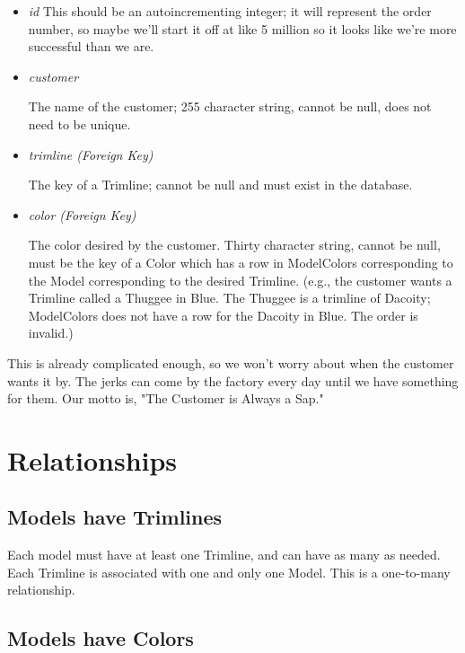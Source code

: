 \documentclass[11pt,letterpaper,oneside]{amsart}
\begin{document}
\begin{itemize}

\item \emph{id}
	This should be an autoincrementing integer; it will represent the order number, so maybe we'll start it off at like 5 million so it looks like we're more successful than we are.

\item \emph{customer}

	The name of the customer; 255 character string, cannot be null, does not need to be unique.
	
\item \emph{trimline (Foreign Key)}
	
	The key of a Trimline; cannot be null and must exist in the database.
	
\item \emph{color (Foreign Key)}

	The color desired by the customer.  Thirty character string, cannot be null, must be the key of a Color which has a row in ModelColors corresponding to the Model corresponding to the desired Trimline.  (e.g., the customer wants a Trimline called a Thuggee in Blue.  The Thuggee is a trimline of Dacoity; ModelColors does not have a row for the Dacoity in Blue.  The order is invalid.)
	
\end{itemize}

This is already complicated enough, so we won't worry about when the customer wants it by.  The jerks can come by the factory every day until we have something for them.  Our motto is, "The Customer is Always a Sap."

\section*{Relationships}

\subsection*{Models have Trimlines}

Each model must have at least one Trimline, and can have as many as needed.  Each Trimline is associated with one and only one Model. This is a one-to-many relationship.

\subsection*{Models have Colors}
\end{document}
